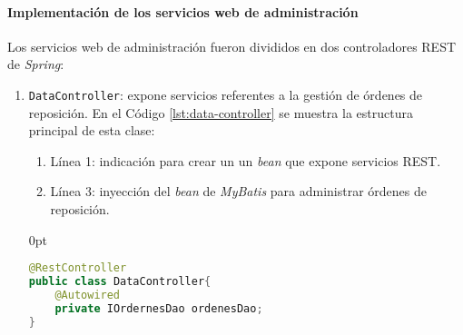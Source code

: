 \paragraph{\noindent Implementación de los servicios web de administración\\}
Los servicios web de administración fueron divididos en dos controladores REST de \textit{Spring}: 
\begin{enumerate}
	\item \texttt{DataController}: expone servicios referentes a la gestión de órdenes de reposición. En el Código \ref{lst:data-controller} se muestra la estructura principal de esta clase:
	\begin{enumerate}
		\item Línea 1: indicación para crear un un \textit{bean} que expone servicios REST.
		\item Línea 3: inyección del \textit{bean} de \textit{MyBatis} para administrar órdenes de reposición.
	\end{enumerate}

\begin{adjustwidth}{\listingfixwidth}{0pt}
\begin{lstlisting}[language=Java, caption={Controlador para exponer servicios web de órdenes de reposición.}, captionpos=b, label={lst:data-controller}]
@RestController
public class DataController{
	@Autowired
	private IOrdernesDao ordenesDao;
}
\end{lstlisting}
\end{adjustwidth}


\end{enumerate}
